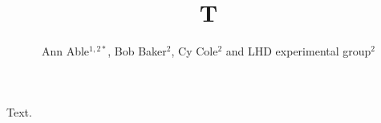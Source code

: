 \documentclass[groupedaddress]{revtex4-1}
\begin{document}
\title{T}
\author{Ann Able$^{1,2*}$, Bob Baker$^{2}$, Cy Cole$^{2}$
and LHD experimental group$^{2}$ }
\address{$^{1}$Univ A}
\address{$^{2}$ National Institute for Fusion Science, Toki, Japan}
\maketitle
Text.
\end{document}
